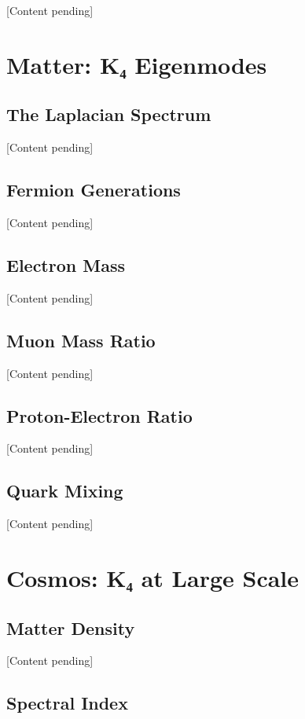 \documentclass[11pt,a4paper]{book}
\begin{document}
[Content pending]


\part{Matter: K₄ Eigenmodes}

\chapter{The Laplacian Spectrum}

[Content pending]

\chapter{Fermion Generations}

[Content pending]

\chapter{Electron Mass}

[Content pending]

\chapter{Muon Mass Ratio}

[Content pending]

\chapter{Proton-Electron Ratio}

[Content pending]

\chapter{Quark Mixing}

[Content pending]


\part{Cosmos: K₄ at Large Scale}

\chapter{Matter Density}

[Content pending]

\chapter{Spectral Index}
\end{document}
